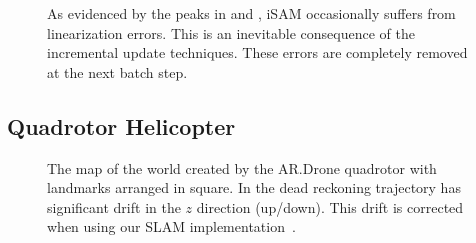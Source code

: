 \documentclass[conference]{IEEEtran}
\begin{document}
\begin{figure}[!t]
\begin{center}
{      \label{fig:victoriaChi2}}
  \end{center}
  \caption{As evidenced by the peaks in  and
    , iSAM occasionally suffers from linearization errors. This
    is an inevitable consequence of the incremental update techniques. These errors are
    completely removed at the next batch step.}
  \label{fig:manhattan}
\end{figure}


\subsection{Quadrotor Helicopter}
\label{sub:results}

\begin{figure}[t]
  \begin{center}
    \caption{The map of the world created by the AR.Drone quadrotor with landmarks
      arranged in square.  In  the dead reckoning trajectory has
      significant drift in the $z$ direction (up/down).  This drift is corrected when
      using our \ac{SLAM} implementation~.}
    \label{fig:mapadjustment}
  \end{center}
\end{figure}
\end{document}
